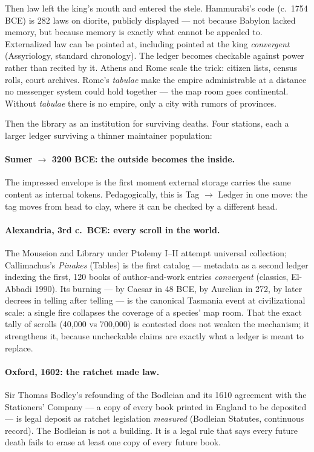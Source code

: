 Then law left the king's mouth and entered the stele. Hammurabi's code (c.\ 1754 BCE) is 282 laws on diorite, publicly displayed --- not because Babylon lacked memory, but because memory is exactly what cannot be appealed to. Externalized law can be pointed at, including pointed at the king \textit{convergent} (Assyriology, standard chronology). The ledger becomes checkable against power rather than recited by it. Athens and Rome scale the trick: citizen lists, census rolls, court archives. Rome's \textit{tabulae} make the empire administrable at a distance no messenger system could hold together --- the map room goes continental. Without \textit{tabulae} there is no empire, only a city with rumors of provinces.

Then the library as an institution for surviving deaths. Four stations, each a larger ledger surviving a thinner maintainer population:

\paragraph{Sumer $\to$ 3200 BCE: the outside becomes the inside.} The impressed envelope is the first moment external storage carries the same content as internal tokens. Pedagogically, this is Tag $\to$ Ledger in one move: the tag moves from head to clay, where it can be checked by a different head.

\paragraph{Alexandria, 3rd c.\ BCE: every scroll in the world.} The Mouseion and Library under Ptolemy I--II attempt universal collection; Callimachus's \textit{Pinakes} (Tables) is the first catalog --- metadata as a second ledger indexing the first, 120 books of author-and-work entries \textit{convergent} (classics, El-Abbadi 1990). Its burning --- by Caesar in 48 BCE, by Aurelian in 272, by later decrees in telling after telling --- is the canonical Tasmania event at civilizational scale: a single fire collapses the coverage of a species' map room. That the exact tally of scrolls (40,000 vs 700,000) is contested does not weaken the mechanism; it strengthens it, because uncheckable claims are exactly what a ledger is meant to replace.

\paragraph{Oxford, 1602: the ratchet made law.} Sir Thomas Bodley's refounding of the Bodleian and its 1610 agreement with the Stationers' Company --- a copy of every book printed in England to be deposited --- is legal deposit as ratchet legislation \textit{measured} (Bodleian Statutes, continuous record). The Bodleian is not a building. It is a legal rule that says every future death fails to erase at least one copy of every future book.

